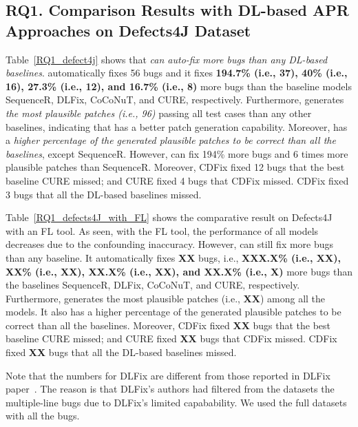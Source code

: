 \subsection{\bf RQ1. Comparison Results with DL-based APR Approaches on Defects4J Dataset}

Table~\ref{RQ1_defect4j} shows that {\em {\tool} can auto-fix more bugs
than any DL-based baselines}. {\tool}
automatically fixes 56 bugs and it fixes {\bf 194.7\% (i.e., 37), 40\%
(i.e., 16), 27.3\% (i.e., 12), and 16.7\% (i.e., 8)} more bugs than the
baseline models SequenceR, DLFix, CoCoNuT, and CURE,
respectively. Furthermore, {\tool} generates {\em the most plausible
patches (i.e., 96)} passing all test cases than any other baselines,
indicating that {\tool} has a better patch generation
capability. Moreover, {\tool} has a {\em higher percentage of the generated
plausible patches to be correct than all the baselines}, except
SequenceR. However, {\tool} can fix 194\% more bugs and 6 times more
plausible patches than SequenceR.
%
Moreover, CDFix fixed 12 bugs that the best baseline CURE missed; and
CURE fixed 4 bugs that CDFix missed. CDFix fixed 3 bugs that all the
DL-based baselines missed.

Table~\ref{RQ1_defects4J_with_FL} shows the comparative result on
Defects4J with an FL tool. As seen, with the FL tool, the performance
of all models decreases due to the confounding inaccuracy. However,
{\tool} can still fix more bugs than any baseline. It
automatically fixes {\bf XX} bugs, i.e., {\bf XXX.X\% (i.e., XX), XX\%
  (i.e., XX), XX.X\% (i.e., XX), and XX.X\% (i.e., X)} more bugs than
the baselines SequenceR, DLFix, CoCoNuT, and CURE,
respectively. Furthermore, {\tool} generates the most plausible
patches (i.e., {\bf XX}) among all the models.
It also has a higher percentage of the generated plausible patches to
be correct than all the baselines.
Moreover, CDFix fixed {\bf XX} bugs that the best baseline CURE
missed; and CURE fixed {\bf XX} bugs that CDFix missed. CDFix fixed
{\bf XX} bugs that all the DL-based baselines missed.

Note that the numbers for DLFix are different from those
reported in DLFix paper~\cite{icse20}. The reason is that DLFix's
authors had filtered from the datasets the multiple-line bugs due to
DLFix's limited capabability. We used the full datasets with all the
bugs.

